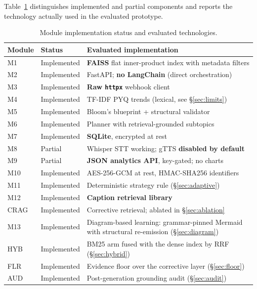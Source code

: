\documentclass[conference]{IEEEtran}
\begin{document}
Table~\ref{tab:status} distinguishes implemented and partial components
and reports the technology actually used in the evaluated prototype.

\begin{table}[htbp]
\caption{Module implementation status and evaluated technologies.}
\label{tab:status}
\centering
\begin{tabular}{p{0.9cm} p{2.4cm} p{3.6cm}}
\toprule
\textbf{Module} & \textbf{Status} & \textbf{Evaluated implementation} \\
\midrule
M1 & Implemented & \textbf{FAISS} flat inner-product index with metadata filters \\
M2 & Implemented & FastAPI; \textbf{no LangChain} (direct orchestration) \\
M3 & Implemented & \textbf{Raw \texttt{httpx}} webhook client \\
M4 & Implemented & TF-IDF PYQ trends (lexical, see §\ref{sec:limits}) \\
M5 & Implemented & Bloom's blueprint + structural validator \\
M6 & Implemented & Planner with retrieval-grounded subtopics \\
M7 & Implemented & \textbf{SQLite}, encrypted at rest \\
M8 & Partial & Whisper STT working; gTTS \textbf{disabled by default} \\
M9 & Partial & \textbf{JSON analytics API}, key-gated; no charts \\
M10 & Implemented & AES-256-GCM at rest, HMAC-SHA256 identifiers \\
M11 & Implemented & Deterministic strategy rule (§\ref{sec:adaptive}) \\
M12 & Implemented & \textbf{Caption retrieval library} \\
CRAG & Implemented & Corrective retrieval; ablated in §\ref{sec:ablation} \\
M13 & Implemented & Diagram-based learning: grammar-pinned Mermaid with structural re-emission (§\ref{sec:diagram}) \\
HYB & Implemented & BM25 arm fused with the dense index by RRF (§\ref{sec:hybrid}) \\
FLR & Implemented & Evidence floor over the corrective layer (§\ref{sec:floor}) \\
AUD & Implemented & Post-generation grounding audit (§\ref{sec:audit}) \\
\bottomrule
\end{tabular}
\end{table}
\end{document}
